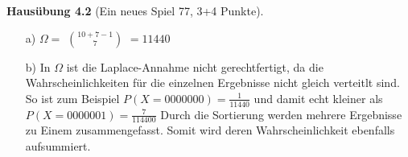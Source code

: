 \textbf{Hausübung 4.2} (Ein neues Spiel 77, 3+4 Punkte).
\begin{enumerate}
		\item[a)] 
				$\Omega = $ $ 10 + 7 - 1 \choose 7 $ $ = 11440 $
		
		\item[b)] 
			In $\Omega$ ist die Laplace-Annahme nicht gerechtfertigt, da die Wahrscheinlichkeiten für die einzelnen Ergebnisse nicht gleich verteitlt sind.
			So ist zum Beispiel $P(X=0000000) = \frac{1}{11440}$ und damit echt kleiner als $P(X=0000001) = \frac{7}{114400}$
			Durch die Sortierung werden mehrere Ergebnisse zu Einem zusammengefasst. Somit wird deren Wahrscheinlichkeit ebenfalls aufsummiert.
\end{enumerate}
